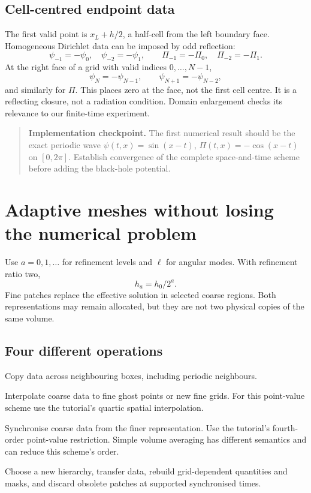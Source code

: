 \documentclass[11pt,a4paper]{article}
\numberwithin{equation}{section}
\newenvironment{checkpoint}{\begin{quote}\small\textbf{Implementation checkpoint.} }{\end{quote}}
\begin{document}
\subsection{Cell-centred endpoint data}
The first valid point is $x_L+h/2$, a half-cell from the left boundary face.
Homogeneous Dirichlet data can be imposed by odd reflection:
\begin{equation}
 \psi_{-1}=-\psi_0,\quad\psi_{-2}=-\psi_1,\qquad
 \Pi_{-1}=-\Pi_0,\quad\Pi_{-2}=-\Pi_1 .
\end{equation}
At the right face of a grid with valid indices $0,\ldots,N-1$,
\begin{equation}
 \psi_N=-\psi_{N-1},\qquad\psi_{N+1}=-\psi_{N-2},
\end{equation}
and similarly for $\Pi$. This places zero at the face, not the first
cell centre. It is a reflecting closure, not a radiation condition.
Domain enlargement checks its relevance to our finite-time experiment.

\begin{checkpoint}
The first numerical result should be the exact periodic wave
$\psi(t,x)=\sin(x-t)$, $\Pi(t,x)=-\cos(x-t)$ on $[0,2\pi]$.
Establish convergence of the complete space-and-time scheme before adding
the black-hole potential.
\end{checkpoint}

\section{Adaptive meshes without losing the numerical problem}\label{sec:amr}

Use $a=0,1,\ldots$ for refinement levels and $\ell$ for angular modes.
With refinement ratio two,
\begin{equation}
 h_a=h_0/2^a.
\end{equation}
Fine patches replace the effective solution in selected coarse regions.
Both representations may remain allocated, but they are not two physical
copies of the same volume.

\subsection{Four different operations}
\begin{description}[style=nextline]
\item[Same-level ghost exchange.]
Copy data across neighbouring boxes, including periodic neighbours.
\item[Prolongation.]
Interpolate coarse data to fine ghost points or new fine grids.
For this point-value scheme use the tutorial's quartic spatial interpolation.
\item[Restriction.]
Synchronise coarse data from the finer representation. Use the tutorial's
fourth-order point-value restriction. Simple volume averaging has different
semantics and can reduce this scheme's order.
\item[Regridding.]
Choose a new hierarchy, transfer data, rebuild grid-dependent quantities
and masks, and discard obsolete patches at supported synchronised times.
\end{description}
\end{document}
